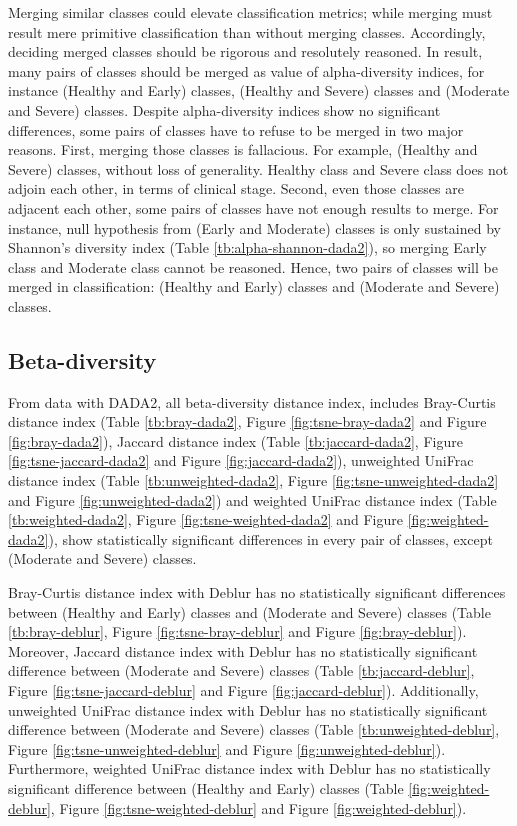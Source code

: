 \documentclass[a4paper]{article}
\begin{document}
            Merging similar classes could elevate classification metrics; while merging must result mere primitive classification than without merging classes. Accordingly, deciding merged classes should be rigorous and resolutely reasoned. In result, many pairs of classes should be merged as value of alpha-diversity indices, for instance (Healthy and Early) classes, (Healthy and Severe) classes and (Moderate and Severe) classes. Despite alpha-diversity indices show no significant differences, some pairs of classes have to refuse to be merged in two major reasons. First, merging those classes is fallacious. For example, (Healthy and Severe) classes, without loss of generality. Healthy class and Severe class does not adjoin each other, in terms of clinical stage. Second, even those classes are adjacent each other, some pairs of classes have not enough results to merge. For instance, null hypothesis from (Early and Moderate) classes is only sustained by Shannon's diversity index (Table \ref{tb:alpha-shannon-dada2}), so merging Early class and Moderate class cannot be reasoned. Hence, two pairs of classes will be merged in classification: (Healthy and Early) classes and (Moderate and Severe) classes.

        \subsection{Beta-diversity}
            From data with DADA2, all beta-diversity distance index, includes Bray-Curtis distance index (Table \ref{tb:bray-dada2}, Figure \ref{fig:tsne-bray-dada2} and Figure \ref{fig:bray-dada2}), Jaccard distance index (Table \ref{tb:jaccard-dada2}, Figure \ref{fig:tsne-jaccard-dada2} and Figure \ref{fig:jaccard-dada2}), unweighted UniFrac distance index (Table \ref{tb:unweighted-dada2}, Figure \ref{fig:tsne-unweighted-dada2} and Figure \ref{fig:unweighted-dada2}) and weighted UniFrac distance index (Table \ref{tb:weighted-dada2}, Figure \ref{fig:tsne-weighted-dada2} and Figure \ref{fig:weighted-dada2}), show statistically significant differences in every pair of classes, except (Moderate and Severe) classes.

            Bray-Curtis distance index with Deblur has no statistically significant differences between (Healthy and Early) classes and (Moderate and Severe) classes (Table \ref{tb:bray-deblur}, Figure \ref{fig:tsne-bray-deblur} and Figure \ref{fig:bray-deblur}). Moreover, Jaccard distance index with Deblur has no statistically significant difference between (Moderate and Severe) classes (Table \ref{tb:jaccard-deblur}, Figure \ref{fig:tsne-jaccard-deblur} and Figure \ref{fig:jaccard-deblur}). Additionally, unweighted UniFrac distance index with Deblur has no statistically significant difference between (Moderate and Severe) classes (Table \ref{tb:unweighted-deblur}, Figure \ref{fig:tsne-unweighted-deblur} and Figure \ref{fig:unweighted-deblur}). Furthermore, weighted UniFrac distance index with Deblur has no statistically significant difference between (Healthy and Early) classes (Table \ref{fig:weighted-deblur}, Figure \ref{fig:tsne-weighted-deblur} and Figure \ref{fig:weighted-deblur}).
\end{document}

